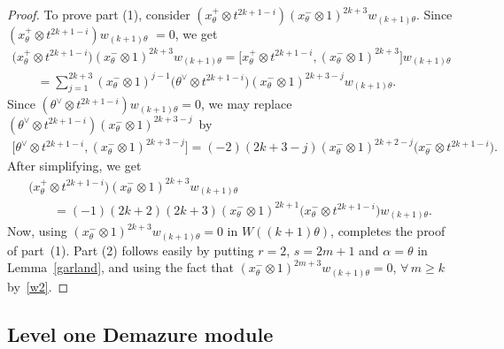 \documentclass[pdftex]{sigma}
\numberwithin{equation}{section}
\begin{document}
\begin{proof}
To prove part (1), consider $(x^{+}_{\theta}\!\otimes t^{2k{+}1{-}i}) (x^{-}_{\theta}\otimes 1)^{2k{+}3}w_{(k{+}1)\theta}$.
Since $(x^{+}_{\theta}\!\otimes t^{2k{+}1{-}i})w_{(k{+}1)\theta}$ $=0$, we get
\begin{gather*}
\big(x^{+}_{\theta}\otimes t^{2k+1-i}\big) (x^{-}_{\theta}\otimes 1)^{2k+3}w_{(k+1)\theta}
=\big[x^{+}_{\theta}\otimes t^{2k+1-i}, (x^{-}_{\theta}\otimes 1)^{2k+3}\big] w_{(k+1)\theta}
\\
\qquad{}
=\sum\limits_{j=1}^{2k+3}  (x^{-}_{\theta}\otimes 1)^{j-1}\big(\theta^{\vee}\otimes t^{2k+1-i}\big)(x^{-}_{\theta}\otimes
1)^{2k+3-j}w_{(k+1)\theta}.
\end{gather*}
Since $(\theta^{\vee}\otimes t^{2k+1-i})w_{(k+1)\theta}=0$, we may replace $(\theta^{\vee}\otimes
t^{2k+1-i})(x^{-}_{\theta}\otimes 1)^{2k+3-j}$~by
\begin{gather*}
\big[\theta^{\vee}\otimes t^{2k+1-i}, (x^{-}_{\theta}\otimes 1)^{2k+3-j}\big]
=(-2)(2k+3-j)(x^{-}_{\theta}\otimes 1)^{2k+2-j}\big(x^{-}_{\theta}\otimes t^{2k+1-i}\big).
\end{gather*}
After simplifying, we get
\begin{gather*}
\big(x^{+}_{\theta}\otimes t^{2k+1-i}\big) (x^{-}_{\theta}\otimes 1)^{2k+3}w_{(k+1)\theta}
\\
\qquad{}
=(-1)(2k+2)(2k+3)(x^{-}_{\theta}\otimes 1)^{2k+1}\big(x^{-}_{\theta}\otimes t^{2k+1-i}\big)w_{(k+1)\theta}.
\end{gather*}
Now, using $(x^{-}_{\theta}\otimes 1)^{2k+3}w_{(k+1)\theta}=0$ in $W((k+1)\theta)$, completes the proof of part~(1).
Part (2) follows easily by putting $r=2$, $s=2m+1$ and $\alpha=\theta$ in Lemma~\ref{garland}, and using the fact that
$(x^{-}_{\theta}\otimes 1)^{2m+3}w_{(k+1)\theta}=0$, $\forall\,
m\geq k$ by~\eqref{w2}.
\end{proof}

\subsection{Level one Demazure module}\label{section3.2}
\end{document}
